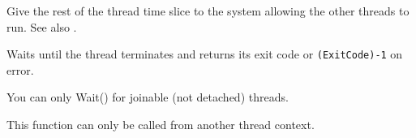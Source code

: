 \label{wxthreadyield}


Give the rest of the thread time slice to the system allowing the other threads to run.
See also .


\label{wxthreadwait}


Waits until the thread terminates and returns its exit code or {\tt (ExitCode)-1} on error.

You can only Wait() for joinable (not detached) threads.

This function can only be called from another thread context.

